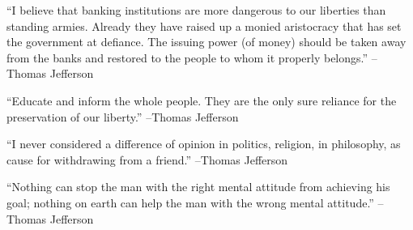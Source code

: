 \documentclass{article}%
\begin{document}
\linebreak%
\vspace{1mm}%
\begin{minipage}{\textwidth}%
\flushleft%
“I believe that banking institutions are more dangerous to our liberties than standing armies. Already they have raised up a monied aristocracy that has set the government at defiance. The issuing power (of money) should be taken away from the banks and restored to the people to whom it properly belongs.”%
\linebreak%
\vspace{1mm}%
–Thomas Jefferson%
\linebreak%
\vspace{1mm}%
\end{minipage}%
\linebreak%
\vspace{1mm}%
\begin{minipage}{\textwidth}%
\flushleft%
“Educate and inform the whole people. They are the only sure reliance for the preservation of our liberty.”%
\linebreak%
\vspace{1mm}%
–Thomas Jefferson%
\linebreak%
\vspace{1mm}%
\end{minipage}%
\linebreak%
\vspace{1mm}%
\begin{minipage}{\textwidth}%
\flushleft%
“I never considered a difference of opinion in politics, religion, in philosophy, as cause for withdrawing from a friend.”%
\linebreak%
\vspace{1mm}%
–Thomas Jefferson%
\linebreak%
\vspace{1mm}%
\end{minipage}%
\linebreak%
\vspace{1mm}%
\begin{minipage}{\textwidth}%
\flushleft%
“Nothing can stop the man with the right mental attitude from achieving his goal; nothing on earth can help the man with the wrong mental attitude.”%
\linebreak%
\vspace{1mm}%
–Thomas Jefferson%
\linebreak%
\vspace{1mm}%
\end{minipage}%
\linebreak%
\end{document}
